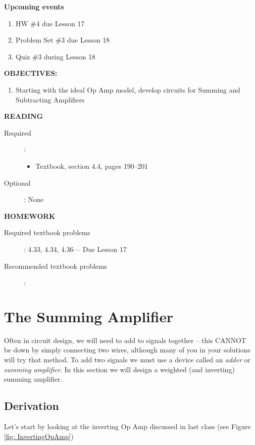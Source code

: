 \documentclass{handout}
\begin{document}
\maketitle

\textbf{Upcoming events}
\begin{enumerate}
\item HW \#4 due Lesson 17
\item Problem Set \#3 due Lesson 18
\item Quiz \#3 during Lesson 18
\end{enumerate}

\textbf{OBJECTIVES:}
\begin{enumerate}
\item Starting with the ideal Op Amp model, develop circuits for Summing and Subtracting Amplifiers
\end{enumerate}

\textbf{READING}
\begin{description}
\item [Required]:
\begin{itemize}
\item  Textbook, section 4.4, pages 190--201
\end{itemize}
\item [Optional]: None
\end{description}

\textbf{HOMEWORK}
\begin{description}
\item [Required textbook problems]: 4.33, 4.34, 4.36--- Due Lesson 17
\item [Recommended textbook problems]: 
\end{description}

\section{The Summing Amplifier}
Often in circuit design, we will need to add to signals together -- this CANNOT be down by simply connecting two wires, although many of you in your solutions will try that method.  To add two signals we must use a device called an {\em adder} or {\em summing amplifier}.   In this section we will design a weighted (and inverting) summing amplifier.

\subsection{Derivation}
Let's start by looking at the inverting Op Amp discussed in last class (see Figure \ref{fig: InvertingOpAmp})
\end{document}
